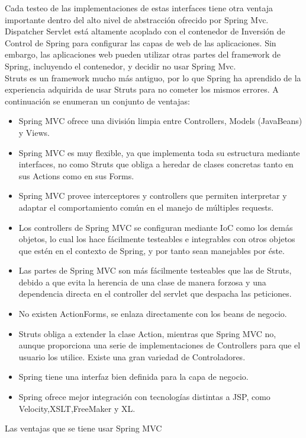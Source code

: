 \begin{itemize}
		Cada testeo de las implementaciones de estas interfaces tiene otra ventaja importante dentro del alto nivel de abstracción ofrecido por Spring Mvc. Dispatcher Servlet está altamente acoplado con el contenedor de Inversión de Control de Spring para configurar las capas de web de las aplicaciones. Sin embargo, las aplicaciones web pueden utilizar otras partes del framework de Spring, incluyendo el contenedor, y decidir no usar Spring Mvc. \cite{MVC}\\
		Struts es un framework mucho más antiguo, por lo que Spring ha aprendido de la experiencia adquirida de usar Struts para no cometer los mismos errores. \cite{introspring}
		A continuación se enumeran un conjunto de ventajas:
		\begin{itemize}
			\item Spring MVC ofrece una división limpia entre Controllers, Models (JavaBeans) y Views. 
			\item Spring MVC es muy flexible, ya que implementa toda su estructura mediante interfaces, no como Struts que obliga a heredar de clases concretas tanto en sus Actions como en sus Forms. 
			\item Spring MVC provee interceptores y controllers que permiten interpretar y adaptar el comportamiento común en el manejo de múltiples requests.
			\item Los controllers de Spring MVC se configuran mediante IoC como los demás objetos, lo cual los hace fácilmente testeables e integrables con otros objetos que estén en el contexto de Spring, y por tanto sean manejables por éste. 
			\item Las partes de Spring MVC son más fácilmente testeables que las de Struts, debido a que evita la herencia de una clase de manera forzosa y una dependencia directa en el controller del servlet que despacha las peticiones. 
			\item No existen ActionForms, se enlaza directamente con los beans de negocio. 
			\item Struts obliga a extender la clase Action, mientras que Spring MVC no, aunque proporciona una serie de implementaciones de Controllers para que el usuario los utilice. Existe una gran variedad de Controladores.
			\item Spring tiene una interfaz bien definida para la capa de negocio. 
			\item Spring ofrece mejor integración con tecnologías distintas a JSP, como Velocity,XSLT,FreeMaker y XL. 
		\end{itemize}
		Las ventajas que se tiene usar Spring MVC 

\end{itemize}

